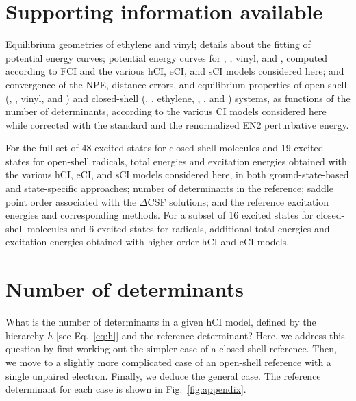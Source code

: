 \documentclass[aip,jcp,reprint,noshowkeys,superscriptaddress]{revtex4-1}
\begin{document}
\section*{Supporting information available}
\label{sec:SI}

Equilibrium geometries of ethylene and vinyl; details about the fitting of potential energy curves;
potential energy curves for , , vinyl, and ,
computed according to FCI and the various hCI, eCI, and sCI models considered here;
and convergence of the NPE, distance errors, and equilibrium properties of
open-shell (, , vinyl, and )
and closed-shell (, , ethylene, , , and ) systems,
as functions of the number of determinants, according to the various CI models considered here while
corrected with the standard and the renormalized EN2 perturbative energy.

For the full set of 48 excited states for closed-shell molecules and 19 excited states for open-shell radicals,
total energies and excitation energies obtained with
the various hCI, eCI, and sCI models considered here, in both ground-state-based and state-specific approaches;
number of determinants in the reference; saddle point order associated with the $\Delta$CSF solutions;
and the reference excitation energies and corresponding methods.
For a subset of 16 excited states for closed-shell molecules and 6 excited states for radicals,
additional total energies and excitation energies obtained with higher-order hCI and eCI models.



\appendix

\section{Number of determinants}
\label{app:appendix}

What is the number of determinants in a given hCI model, defined by the hierarchy $h$ [see Eq.~\eqref{eq:h}] and the reference determinant?
Here, we address this question by first working out the simpler case of a closed-shell reference.
Then, we move to a slightly more complicated case of an open-shell reference with a single unpaired electron.
Finally, we deduce the general case.
The reference determinant for each case is shown in Fig.~\ref{fig:appendix}.
\end{document}
